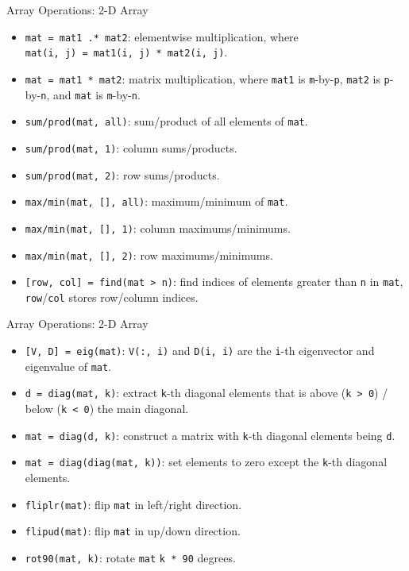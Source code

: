 \begin{frame}[fragile]{Array Operations: 2-D Array}
\protect\hypertarget{array-operations-2-d-array}{}
\begin{itemize}[<+->]
\tightlist
\item
  \texttt{mat\ =\ mat1\ .*\ mat2}: elementwise multiplication, where
  \texttt{mat(i,\ j)\ =\ mat1(i,\ j)\ *\ mat2(i,\ j)}.
\item
  \texttt{mat\ =\ mat1\ *\ mat2}: matrix multiplication, where
  \texttt{mat1} is \texttt{m}-by-\texttt{p}, \texttt{mat2} is
  \texttt{p}-by-\texttt{n}, and \texttt{mat} is
  \texttt{m}-by-\texttt{n}.
\item
  \texttt{sum/prod(mat,\ \textquotesingle{}all\textquotesingle{})}:
  sum/product of all elements of \texttt{mat}.
\item
  \texttt{sum/prod(mat,\ 1)}: column sums/products.
\item
  \texttt{sum/prod(mat,\ 2)}: row sums/products.
\item
  \texttt{max/min(mat,\ {[}{]},\ \textquotesingle{}all\textquotesingle{})}:
  maximum/minimum of \texttt{mat}.
\item
  \texttt{max/min(mat,\ {[}{]},\ 1)}: column maximums/minimums.
\item
  \texttt{max/min(mat,\ {[}{]},\ 2)}: row maximums/minimums.
\item
  \texttt{{[}row,\ col{]}\ =\ find(mat\ \textgreater{}\ n)}: find
  indices of elements greater than \texttt{n} in \texttt{mat},
  \texttt{row}/\texttt{col} stores row/column indices.
\end{itemize}
\end{frame}

\begin{frame}[fragile]{Array Operations: 2-D Array}
\protect\hypertarget{array-operations-2-d-array-1}{}
\begin{itemize}[<+->]
\tightlist
\item
  \texttt{{[}V,\ D{]}\ =\ eig(mat)}: \texttt{V(:,\ i)} and
  \texttt{D(i,\ i)} are the \texttt{i}-th eigenvector and eigenvalue of
  \texttt{mat}.
\item
  \texttt{d\ =\ diag(mat,\ k)}: extract \texttt{k}-th diagonal elements
  that is above (\texttt{k\ \textgreater{}\ 0}) / below
  (\texttt{k\ \textless{}\ 0}) the main diagonal.
\item
  \texttt{mat\ =\ diag(d,\ k)}: construct a matrix with \texttt{k}-th
  diagonal elements being \texttt{d}.
\item
  \texttt{mat\ =\ diag(diag(mat,\ k))}: set elements to zero except the
  \texttt{k}-th diagonal elements.
\item
  \texttt{fliplr(mat)}: flip \texttt{mat} in left/right direction.
\item
  \texttt{flipud(mat)}: flip \texttt{mat} in up/down direction.
\item
  \texttt{rot90(mat,\ k)}: rotate \texttt{mat} \texttt{k\ *\ 90}
  degrees.
\end{itemize}
\end{frame}

